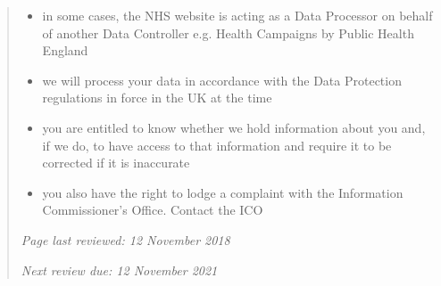 \documentclass[twocolumn, letterpaper,13pt]{scrartcl}
\begin{document}
\begin{quote}
        \begin{itemize}
            \item in some cases, the NHS website is acting as a Data Processor on behalf of another Data Controller e.g. Health Campaigns by Public Health England
            \item we will process your data in accordance with the Data Protection regulations in force in the UK at the time
            \item you are entitled to know whether we hold information about you and, if we do, to have access to that information and require it to be corrected if it is inaccurate
            \item you also have the right to lodge a complaint with the Information Commissioner's Office. Contact the ICO
        \end{itemize}
        
        \textit{Page last reviewed: 12 November 2018}
        
        \textit{Next review due: 12 November 2021}
	\end{quote}
\end{document}
